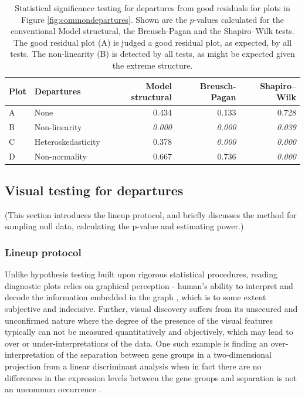 \documentclass[]{interact}
\theoremstyle{plain}%
\theoremstyle{definition}
\theoremstyle{remark}
\begin{document}
\begin{table}

\caption{\label{tab:example-residual-plot-table}Statistical significance testing for departures from good residuals for plots in Figure \ref{fig:commondepartures}. Shown are the $p$-values calculated for the conventional Model structural, the Breusch-Pagan and the Shapiro–Wilk tests. The good residual plot (A) is judged a good residual plot, as expected, by all tests. The non-linearity (B) is detected by all tests, as might be expected given the extreme structure.}
\centering
\begin{tabular}[t]{llrrr}
\toprule
Plot & Departures & Model structural & Breusch-Pagan & Shapiro–Wilk\\
\midrule
A & None & 0.434 & 0.133 & 0.728\\
B & Non-linearity & \em{0.000} & \em{0.000} & \em{0.039}\\
C & Heteroskedasticity & 0.378 & \em{0.000} & \em{0.000}\\
D & Non-normality & 0.667 & 0.736 & \em{0.000}\\
\bottomrule
\end{tabular}
\end{table}

\hypertarget{visual-testing-for-departures}{%
\subsection{Visual testing for
departures}\label{visual-testing-for-departures}}

(This section introduces the lineup protocol, and briefly discusses the
method for sampling null data, calculating the p-value and estimating
power.)

\hypertarget{lineup-protocol}{%
\subsubsection{Lineup protocol}\label{lineup-protocol}}

Unlike hypothesis testing built upon rigorous statistical procedures,
reading diagnostic plots relies on graphical perception - human's
ability to interpret and decode the information embedded in the graph
\citep{cleveland_graphical_1984}, which is to some extent subjective and
indecisive. Further, visual discovery suffers from its unsecured and
unconfirmed nature where the degree of the presence of the visual
features typically can not be measured quantitatively and objectively,
which may lead to over or under-interpretations of the data. One such
example is finding an over-interpretation of the separation between gene
groups in a two-dimensional projection from a linear discriminant
analysis when in fact there are no differences in the expression levels
between the gene groups and separation is not an uncommon occurrence
\citep{roy_chowdhury_using_2015}.
\end{document}
